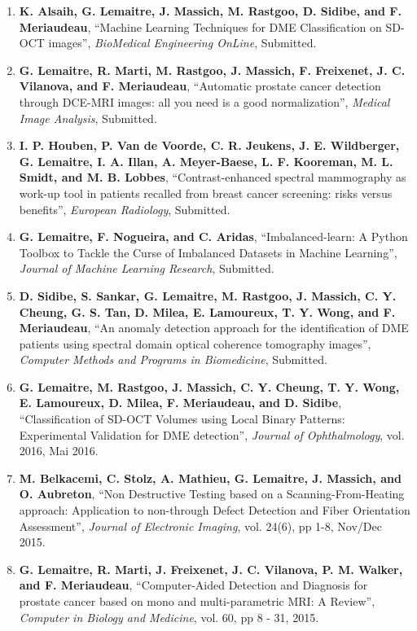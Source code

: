 {\begin{enumerate}
\item \textbf{K. Alsaih, G. Lemaitre, J. Massich, M. Rastgoo, D. Sidibe, and F. Meriaudeau}, ``Machine Learning Techniques for DME Classification on SD-OCT images'', \textit{BioMedical Engineering OnLine}, Submitted.
\item \textbf{G. Lemaitre, R. Marti, M. Rastgoo, J. Massich, F. Freixenet, J. C. Vilanova, and F. Meriaudeau}, ``Automatic prostate cancer detection through DCE-MRI images: all you need is a good normalization'', \textit{Medical Image Analysis}, Submitted.
\item \textbf{I. P. Houben, P. Van de Voorde, C. R. Jeukens, J. E. Wildberger, G. Lemaitre, I. A. Illan, A. Meyer-Baese, L. F. Kooreman, M. L. Smidt, and M. B. Lobbes}, ``Contrast-enhanced spectral mammography as work-up tool in patients recalled from breast cancer screening: risks versus benefits'', \textit{European Radiology}, Submitted.
\item \textbf{G. Lemaitre, F. Nogueira, and C. Aridas}, ``Imbalanced-learn: A Python Toolbox to Tackle the Curse of Imbalanced Datasets in Machine Learning'', \textit{Journal of Machine Learning Research}, Submitted.
\item \textbf{D. Sidibe, S. Sankar, G. Lemaitre, M. Rastgoo, J. Massich, C. Y. Cheung, G. S. Tan, D. Milea, E. Lamoureux, T. Y. Wong, and F. Meriaudeau}, ``An anomaly detection approach for the identification of DME patients using spectral domain optical coherence tomography images'', \textit{Computer Methods and Programs in Biomedicine}, Submitted.
\item \textbf{G. Lemaitre, M. Rastgoo, J. Massich, C. Y. Cheung, T. Y. Wong, E. Lamoureux, D. Milea, F. Meriaudeau, and D. Sidibe}, ``Classification of SD-OCT Volumes using Local Binary Patterns: Experimental Validation for DME detection'', \textit{Journal of Ophthalmology}, vol. 2016, Mai 2016.
\item \textbf{M. Belkacemi, C. Stolz, A. Mathieu, G. Lemaitre, J. Massich, and O. Aubreton}, ``Non Destructive Testing based on a Scanning-From-Heating approach: Application to non-through Defect Detection and Fiber Orientation Assessment'', \textit{Journal of Electronic Imaging}, vol. 24(6), pp 1-8, Nov/Dec 2015.
\item \textbf{G. Lemaitre, R. Marti, J. Freixenet, J. C. Vilanova, P. M. Walker, and F. Meriaudeau}, ``Computer-Aided Detection and Diagnosis for prostate cancer based on mono and multi-parametric MRI: A Review'', \textit{Computer in Biology and Medicine}, vol. 60, pp 8 - 31, 2015.
\end{enumerate}

}
